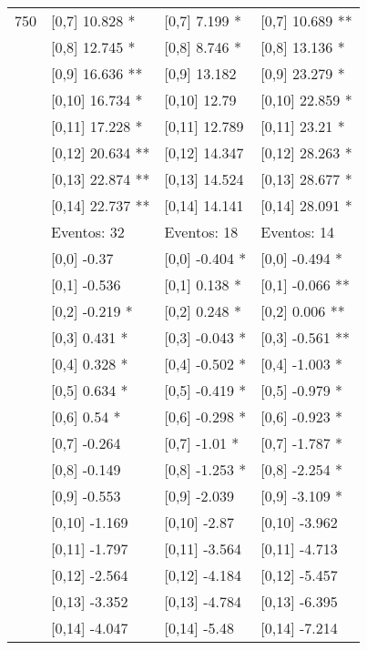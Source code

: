 \begin{table}
\begin{tabular}[t]{llll}
750 & {}[0,7] 10.828 * & {}[0,7] 7.199 * & {}[0,7] 10.689 **\\
\addlinespace
 & {}[0,8] 12.745 * & {}[0,8] 8.746 * & {}[0,8] 13.136 *\\
 & {}[0,9] 16.636 ** & {}[0,9] 13.182 & {}[0,9] 23.279 *\\
 & {}[0,10] 16.734 * & {}[0,10] 12.79 & {}[0,10] 22.859 *\\
 & {}[0,11] 17.228 * & {}[0,11] 12.789 & {}[0,11] 23.21 *\\
 & {}[0,12] 20.634 ** & {}[0,12] 14.347 & {}[0,12] 28.263 *\\
\addlinespace
 & {}[0,13] 22.874 ** & {}[0,13] 14.524 & {}[0,13] 28.677 *\\
 & {}[0,14] 22.737 ** & {}[0,14] 14.141 & {}[0,14] 28.091 *\\
 & Eventos:  32 & Eventos:  18 & Eventos:  14\\
 & {}[0,0] -0.37 & {}[0,0] -0.404 * & {}[0,0] -0.494 *\\
 & {}[0,1] -0.536 & {}[0,1] 0.138 * & {}[0,1] -0.066 **\\
\addlinespace
 & {}[0,2] -0.219 * & {}[0,2] 0.248 * & {}[0,2] 0.006 **\\
 & {}[0,3] 0.431 * & {}[0,3] -0.043 * & {}[0,3] -0.561 **\\
 & {}[0,4] 0.328 * & {}[0,4] -0.502 * & {}[0,4] -1.003 *\\
 & {}[0,5] 0.634 * & {}[0,5] -0.419 * & {}[0,5] -0.979 *\\
 & {}[0,6] 0.54 * & {}[0,6] -0.298 * & {}[0,6] -0.923 *\\
\addlinespace
1000 & {}[0,7] -0.264 & {}[0,7] -1.01 * & {}[0,7] -1.787 *\\
 & {}[0,8] -0.149 & {}[0,8] -1.253 * & {}[0,8] -2.254 *\\
 & {}[0,9] -0.553 & {}[0,9] -2.039 & {}[0,9] -3.109 *\\
 & {}[0,10] -1.169 & {}[0,10] -2.87 & {}[0,10] -3.962\\
 & {}[0,11] -1.797 & {}[0,11] -3.564 & {}[0,11] -4.713\\
\addlinespace
 & {}[0,12] -2.564 & {}[0,12] -4.184 & {}[0,12] -5.457\\
 & {}[0,13] -3.352 & {}[0,13] -4.784 & {}[0,13] -6.395\\
 & {}[0,14] -4.047 & {}[0,14] -5.48 & {}[0,14] -7.214\\
\bottomrule
\end{tabular}
\end{table}
